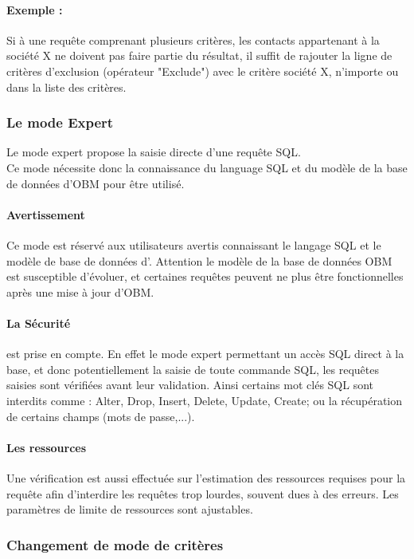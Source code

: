\paragraph{Exemple :} Si à une requête comprenant plusieurs critères, les contacts appartenant à la société X ne doivent pas faire partie du résultat, il suffit de rajouter la ligne de critères d'exclusion (opérateur "Exclude") avec le critère société X, n'importe ou dans la liste des critères.


\subsubsection{Le mode Expert}

Le mode expert propose la saisie directe d'une requête SQL.\\

Ce mode nécessite donc la connaissance du language SQL et du modèle de la base de données d'OBM pour être utilisé.

\paragraph{Avertissement} Ce mode est réservé aux utilisateurs avertis connaissant le langage SQL et le modèle de base de données d'\obm.
Attention le modèle de la base de données OBM est susceptible d'évoluer, et certaines requêtes peuvent ne plus être fonctionnelles après une mise à jour d'OBM.

\paragraph{La Sécurité} est prise en compte. En effet le mode expert permettant un accès SQL direct à la base, et donc potentiellement la saisie de toute commande SQL, les requêtes saisies sont vérifiées avant leur validation.
Ainsi certains mot clés SQL sont interdits comme : Alter, Drop, Insert, Delete, Update, Create; ou la récupération de certains champs (mots de passe,...).

\paragraph{Les ressources} Une vérification est aussi effectuée sur l'estimation des ressources requises pour la requête afin d'interdire les requêtes trop lourdes, souvent dues à des erreurs. Les paramètres de limite de ressources sont ajustables.


\subsubsection{Changement de mode de critères}

